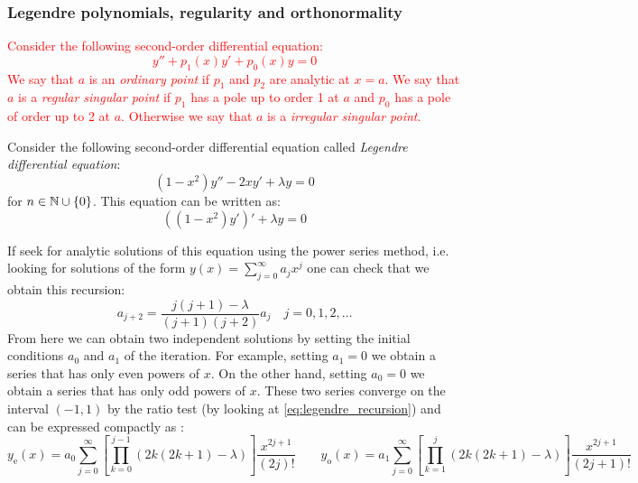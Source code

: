 \documentclass[../main.tex]{subfiles}
\begin{document}
\subsubsection{Legendre polynomials, regularity and orthonormality}
\begin{definition}
  \textcolor{red}{Consider the following second-order differential equation:
    \begin{equation}
      y''+p_1(x)y'+p_0(x)y=0
    \end{equation}
    We say that $a$ is an \emph{ordinary point} if $p_1$ and $p_2$ are analytic at $x=a$. We say that $a$ is a \emph{regular singular point} if $p_1$ has a pole up to order 1 at $a$ and $p_0$ has a pole of order up to 2 at $a$. Otherwise we say that $a$ is a \emph{irregular singular point}.}
\end{definition}
\begin{definition}
  Consider the following second-order differential equation called \emph{Legendre differential equation}:
  \begin{equation}
    (1-x^2)y''-2xy'+\lambda y=0
  \end{equation}
  for $n\in\mathbb{N}\cup\{0\}$. This equation can be written as:
  \begin{equation}\label{eq:legendre_diff_eq}
    {((1-x^2)y')}'+\lambda  y=0
  \end{equation}
\end{definition}
If seek for analytic solutions of this equation using the power series method, i.e. looking for solutions of the form $y(x)=\sum_{j=0}^{\infty}a_jx^j$ one can check that we obtain this recursion:
\begin{equation}\label{eq:legendre_recursion}
  a_{j+2}=\frac{j(j+1)-\lambda}{(j+1)(j+2)}a_j\quad j=0,1,2,\ldots
\end{equation}
From here we can obtain two independent solutions by setting the initial conditions $a_0$ and $a_1$ of the iteration. For example, setting $a_1=0$ we obtain a series that has only even powers of $x$. On the other hand, setting $a_0=0$ we obtain a series that has only odd powers of $x$. These two series converge on the interval $(-1,1)$ by the ratio test (by looking at \cref{eq:legendre_recursion}) and can be expressed compactly as \cite{lorida:legendre}:
\begin{equation}\label{eq:legendre_series}
  y_\mathrm{e}(x)=a_0\sum_{j=0}^{\infty}\left[\prod_{k=0}^{j-1}(2k(2k+1)-\lambda)\right]\frac{x^{2j+1}}{(2j)!}\qquad y_\mathrm{o}(x)=a_1\sum_{j=0}^{\infty}\left[\prod_{k=1}^j(2k(2k+1)-\lambda)\right]\frac{x^{2j+1}}{(2j+1)!}
\end{equation}
\end{document}
